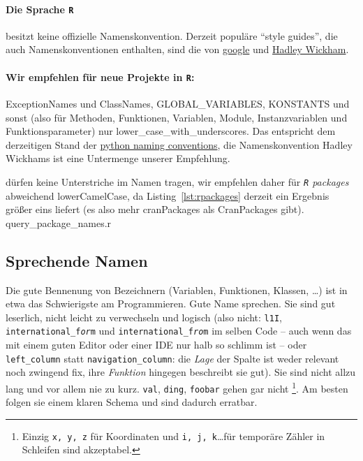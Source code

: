\documentclass[twoside]{scrreprt}
\providecommand{\R}{\texttt{R}}
\providecommand{\code}[1]{\texttt{#1}}
\begin{document}
\paragraph{Die Sprache \R{}} besitzt keine offizielle
Namenskonvention. Derzeit
popul\"a{}re "`style guides"', die auch Namenskonventionen enthalten, sind die
von
\href{https://google-styleguide.googlecode.com/svn/trunk/Rguide.xml}{google} und
\href{http://adv-r.had.co.nz/Style.html}{Hadley Wickham}.
\paragraph{Wir empfehlen f\"u{}r neue Projekte in \R{}:}
ExceptionNames und ClassNames, GLOBAL\_VARIABLES, KONSTANTS und sonst (also
f\"u{}r Methoden, Funktionen, Variablen, Module, Instanzvariablen und
Funktionsparameter) nur 
lower\_case\_with\_underscores.
Das entspricht dem derzeitigen Stand der
\href{http://legacy.python.org/dev/peps/pep-0008/#naming-conventions}{python
  naming conventions}, die Namenskonvention Hadley Wickhams ist eine
  Untermenge unserer Empfehlung.

 d\"urfen keine Unterstriche im Namen 
tragen, wir
empfehlen daher f\"u{}r \emph{\R{} packages} abweichend lowerCamelCase, 
da Listing~\ref{lst:rpackages} derzeit ein Ergebnis gr\"o{}\ss{}er eins 
liefert (es also mehr cranPackages als CranPackages gibt).
%
{query_package_names.r}

\subsection{Sprechende Namen}
Die gute Bennenung von Bezeichnern (Variablen, Funktionen, Klassen, \ldots)
ist in etwa
das Schwierigste am Programmieren. Gute Name sprechen. Sie sind gut leserlich,
nicht leicht zu verwechseln und logisch (also nicht: \code{l1I},
\code{international\_f\emph{or}m} und \code{international\_f\emph{ro}m} im 
selben Code -- auch wenn das mit einem guten Editor oder einer IDE nur halb so 
schlimm ist -- oder \code{left\_column} statt \code{navigation\_column}: die 
\emph{Lage} der Spalte ist weder relevant noch zwingend fix, ihre 
\emph{Funktion} hingegen beschreibt sie gut).
Sie sind nicht allzu lang und vor allem nie zu kurz.
\code{val}, \code{ding}, \code{foobar} gehen gar nicht%
\footnote{Einzig \code{x, y, z} f\"ur Koordinaten
  und \code{i, j, k}\ldots f\"ur tempor\"a{}re Z\"a{}hler in Schleifen sind
  akzeptabel.}.
Am besten folgen sie einem klaren Schema und sind dadurch erratbar.
\end{document}
